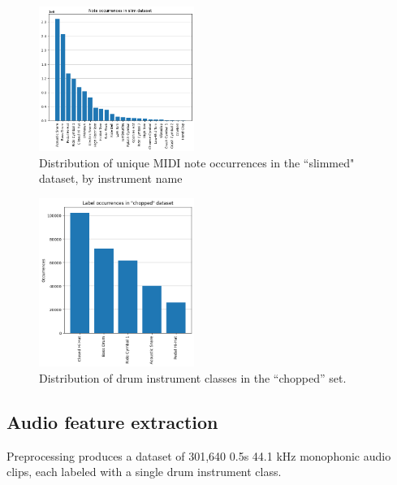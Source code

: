 \documentclass[twocolumn]{article}
\begin{document}
\begin{figure}
  \centering
  \includegraphics[width=0.45\textwidth]{figures/slim_dataset_note_occurrences.png}
  \caption{Distribution of unique MIDI note occurrences in the ``slimmed" dataset, by instrument name}
  \label{fig:slim_dataset_note_occurrences}
\end{figure}

\begin{figure}
  \centering
  \includegraphics[width=0.45\textwidth]{figures/chopped_dataset_label_occurrences.png}
  \caption{Distribution of drum instrument classes in the ``chopped'' set.}
  \label{fig:class_occurrences}
\end{figure}

\subsection{Audio feature extraction}

Preprocessing produces a dataset of 301,640 0.5s 44.1 kHz monophonic audio clips, each labeled with a single drum instrument class.
\end{document}

